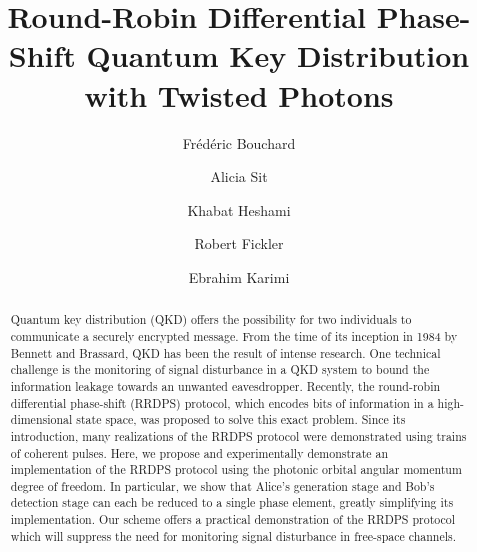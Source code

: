 \documentclass[twocolumn,aps,prl,floatfix,superscriptaddress]{revtex4-1}
\begin{document}
%
\title{Round-Robin Differential Phase-Shift Quantum Key Distribution with Twisted Photons}
%
\author{Fr\'ed\'eric Bouchard}
\author{Alicia Sit}
\author{Khabat Heshami}
\author{Robert Fickler}
\author{Ebrahim Karimi}
%



\begin{abstract}
Quantum key distribution (QKD) offers the possibility for two individuals to communicate a securely encrypted message. From the time of its inception in 1984 by Bennett and Brassard, QKD has been the result of intense research. One technical challenge is the monitoring of signal disturbance in a QKD system to bound the information leakage towards an unwanted eavesdropper. Recently, the round-robin differential phase-shift (RRDPS) protocol, which encodes bits of information in a high-dimensional state space, was proposed to solve this exact problem. Since its introduction, many realizations of the RRDPS protocol were demonstrated using trains of coherent pulses. Here, we propose and experimentally demonstrate an implementation of the RRDPS protocol using the photonic orbital angular momentum degree of freedom. In particular, we show that Alice's generation stage and Bob's detection stage can each be reduced to a single phase element, greatly simplifying its implementation. Our scheme offers a practical demonstration of the RRDPS protocol which will suppress the need for monitoring signal disturbance in free-space channels.
\end{abstract}
\end{document}
